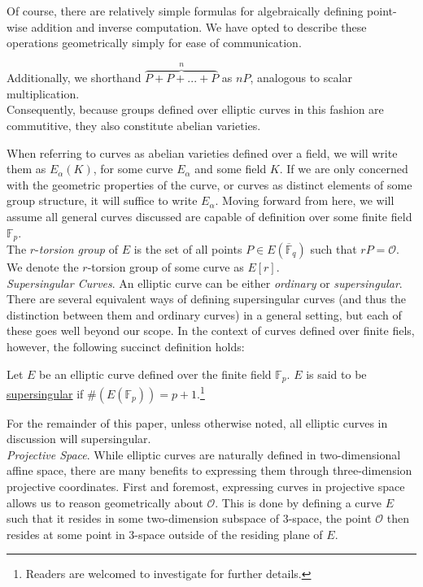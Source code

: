 Of course, there are relatively simple formulas for algebraically defining point-wise addition and inverse computation. We have opted to describe these operations geometrically simply for ease of communication.

Additionally, we shorthand $\overbrace{P + P + ... + P}^{n}$ as $nP$, analogous to scalar multiplication.\\

Consequently, because groups defined over elliptic curves in this fashion are commutitive, they also constitute abelian varieties.

When referring to curves as abelian varieties defined over a field, we will write them as $E_{\alpha}(K)$, for some curve $E_{\alpha}$ and some field $K$. If we are only concerned with the geometric properties of the curve, or curves as distinct elements of some group structure, it will suffice to write $E_{\alpha}$. Moving forward from here, we will assume all general curves discussed are capable of definition over some finite field $\mathbb{F}_p$.\\

The $r$-\emph{torsion group} of $E$ is the set of all points $P \in E(\overline{\mathbb{F}}_q)$ such that $rP = \mathcal{O}$. We denote the $r$-torsion group of some curve as $E[r]$.\\

\noindent
\emph{Supersingular Curves}. An elliptic curve can be either \emph{ordinary} or \emph{supersingular}. There are several equivalent ways of defining supersingular curves (and thus the distinction between them and ordinary curves) in a general setting, but each of these goes well beyond our scope. In the context of curves defined over finite fiels, however, the following succinct definition holds:
\begin{tcolorbox}
\begin{definition}
\label{defn:supersingular}
Let $E$ be an elliptic curve defined over the finite field $\mathbb{F}_{p}$. $E$ is said to be \underline{supersingular} if $\#(E(\mathbb{F}_{p})) = p+1$.\footnote{Readers are welcomed to investigate \cite{pairings} for further details.}
\end{definition}
\end{tcolorbox}

For the remainder of this paper, unless otherwise noted, all elliptic curves in discussion will supersingular.\\ 

\noindent
\emph{Projective Space}\label{snip:projspace}. While elliptic curves are naturally defined in two-dimensional affine space, there are many benefits to expressing them through three-dimension projective coordinates. First and foremost, expressing curves in projective space allows us to reason geometrically about $\mathcal{O}$. This is done by defining a curve $E$ such that it resides in some two-dimension subspace of 3-space, the point $\mathcal{O}$ then resides at some point in 3-space outside of the residing plane of $E$. 

